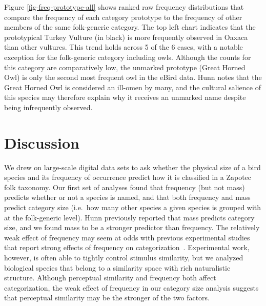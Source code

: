 \documentclass[10pt,letterpaper]{article}
\begin{document}
Figure \ref{fig-freq-prototype-all} shows ranked raw frequency distributions that compare the frequency of each category prototype to the frequency of other members of the same folk-generic category. 
The top left chart indicates that the prototypical Turkey Vulture (in black) is more frequently observed in Oaxaca than other vultures. This trend holds across 5 of the 6 cases, with a notable exception for the folk-generic category including owls. Although the counts for this category are comparatively low, the unmarked prototype (Great Horned Owl) is only the second most frequent owl in the eBird data. Hunn notes that the Great Horned Owl is considered an ill-omen by many, and the cultural salience of this species may therefore explain why it receives an unmarked name despite being infrequently observed. 




\section{Discussion}



We drew on large-scale digital data sets to ask whether the physical size of a bird species and its frequency of occurrence predict how it is classified in a Zapotec folk taxonomy.  Our first set of analyses found that frequency (but not mass) predicts whether or not a species is named, and that both frequency and mass predict category size (i.e.\ how many other species a given species is grouped with at the folk-generic level). Hunn previously reported that mass predicts category size, and we found mass to be a stronger predictor than frequency. The relatively weak effect of frequency may seem at odds with previous experimental studies that report strong effects of frequency on categorization~\cite{parducci83}. Experimental work, however, is often able to tightly control stimulus similarity, but we analyzed biological species that belong to a similarity space with rich naturalistic structure. Although perceptual similarity and frequency both affect categorization, the weak effect of frequency in our category size analysis suggests that perceptual similarity may be the stronger of the two factors.  
\end{document}
